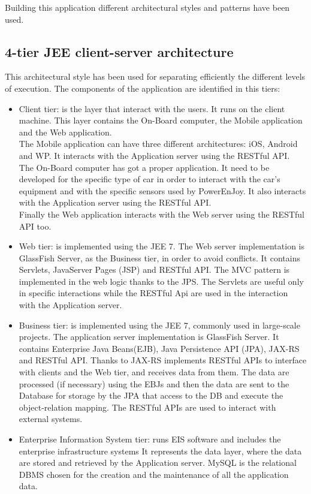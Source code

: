 Building this application different architectural styles and patterns have been used.
\subsection{4-tier JEE client-server architecture}
	This architectural style has been used for separating efficiently the different levels of execution. The components of the application are identified in this tiers:
	\begin{itemize}
		\item{Client tier: is the layer that interact with the users. It runs on the client machine. This layer contains the On-Board computer, the Mobile application and the Web application. 
		\\The Mobile application can have three different architectures: iOS, Android and WP. It interacts with the Application server using the RESTful API.
		\\The On-Board computer has got a proper application. It need to be developed for the specific type of car in order to interact with the car's equipment and with the specific sensors used by PowerEnJoy. It also interacts with the Application server using the RESTful API.
		\\Finally the Web application interacts with the Web server using the RESTful API too.}
		\item{Web tier: is implemented using the JEE 7. The Web server implementation is GlassFish Server, as the Business tier, in order to avoid conflicts. It contains Servlets, JavaServer Pages (JSP) and RESTful API. The MVC pattern is implemented in the web logic thanks to the JPS. The Servlets are useful only in specific interactions while the RESTful Api are used in the interaction with the Application server.}
		\item{Business tier: is implemented using the JEE 7, commonly used in large-scale projects. The application server implementation is  GlassFish Server. It contains Enterprise Java Beans(EJB), Java Persistence API (JPA), JAX-RS and RESTful API. Thanks to JAX-RS implements RESTful APIs to interface with clients and the Web tier, and receives data from them. The data are processed (if necessary) using the EBJs and then the data are sent to the Database for storage by the JPA that access to the DB and execute the object-relation mapping. The RESTful APIs are used to interact with external systems.}
		\item{Enterprise Information System tier: runs EIS software and includes the enterprise infrastructure systems It represents the data layer, where the data are stored and retrieved by the Application server. MySQL is the relational DBMS chosen for the creation and the maintenance of all the application data.}
	\end{itemize}
